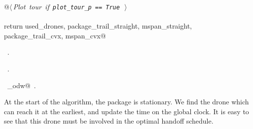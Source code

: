 \documentclass[10pt, english, oneside]{report}
\begin{document}
\begin{flushleft}
\begin{minipage}{\linewidth}
\begin{list}{}{}
\mbox{}\verb@    @\hbox{$\langle\,${\itshape Plot tour if \verb|plot_tour_p == True|}\nobreak\ {\footnotesize {}}$\,\rangle$}\verb@@\\
\mbox{}\verb@@\\
\mbox{}\verb@    return used_drones, package_trail_straight, mspan_straight, package_trail_cvx, mspan_cvx@\\
\mbox{}\verb@@{\NWsep}
\end{list}
\vspace{-1.5ex}
\footnotesize
\begin{list}{}{\setlength{\itemsep}{-\parsep}\setlength{\itemindent}{-\leftmargin}}
\item \NWtxtMacroDefBy\ .
\item \NWtxtMacroRefIn\ .
\item \NWtxtIdentsDefed\nobreak\  \verb@algo_odw@\nobreak\ .
\item{}
\end{list}
\end{minipage}\vspace{4ex}
\end{flushleft}
 
At the start of the algorithm, the package is stationary. We find the drone which can reach it at the earliest, 
and update the time on the global clock. It is easy to see that this drone must be involved in the optimal handoff 
schedule. 
\end{document}
